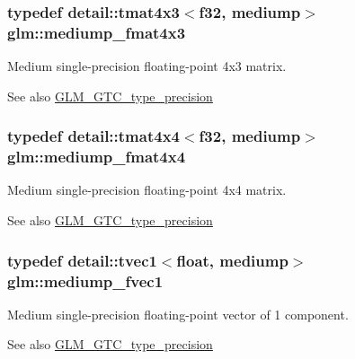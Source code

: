 \subsubsection[{\texorpdfstring{mediump\+\_\+fmat4x3}{mediump_fmat4x3}}]{\setlength{\rightskip}{0pt plus 5cm}typedef detail\+::tmat4x3$<$f32, mediump$>$ {\bf glm\+::mediump\+\_\+fmat4x3}}\hypertarget{group__gtc__type__precision_ga5e5de428d1e1da2c593a6245d92dd8c0}{}\label{group__gtc__type__precision_ga5e5de428d1e1da2c593a6245d92dd8c0}
Medium single-\/precision floating-\/point 4x3 matrix. \begin{DoxySeeAlso}{See also}
\hyperlink{group__gtc__type__precision}{G\+L\+M\+\_\+\+G\+T\+C\+\_\+type\+\_\+precision} 
\end{DoxySeeAlso}
\subsubsection[{\texorpdfstring{mediump\+\_\+fmat4x4}{mediump_fmat4x4}}]{\setlength{\rightskip}{0pt plus 5cm}typedef detail\+::tmat4x4$<$f32, mediump$>$ {\bf glm\+::mediump\+\_\+fmat4x4}}\hypertarget{group__gtc__type__precision_ga7f4ae9d05ca94005a0b7d8e3c59943cd}{}\label{group__gtc__type__precision_ga7f4ae9d05ca94005a0b7d8e3c59943cd}
Medium single-\/precision floating-\/point 4x4 matrix. \begin{DoxySeeAlso}{See also}
\hyperlink{group__gtc__type__precision}{G\+L\+M\+\_\+\+G\+T\+C\+\_\+type\+\_\+precision} 
\end{DoxySeeAlso}
\subsubsection[{\texorpdfstring{mediump\+\_\+fvec1}{mediump_fvec1}}]{\setlength{\rightskip}{0pt plus 5cm}typedef detail\+::tvec1$<$float, mediump$>$ {\bf glm\+::mediump\+\_\+fvec1}}\hypertarget{group__gtc__type__precision_ga4534af301d5260974cee29f76842d579}{}\label{group__gtc__type__precision_ga4534af301d5260974cee29f76842d579}
Medium single-\/precision floating-\/point vector of 1 component. \begin{DoxySeeAlso}{See also}
\hyperlink{group__gtc__type__precision}{G\+L\+M\+\_\+\+G\+T\+C\+\_\+type\+\_\+precision} 
\end{DoxySeeAlso}
